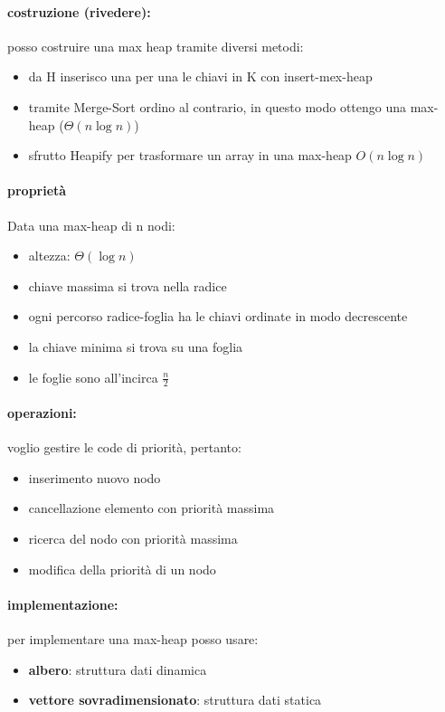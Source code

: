 \documentclass{article}
\begin{document}
\paragraph{costruzione (rivedere):} posso costruire una max heap tramite diversi metodi:
\begin{itemize}
    \item da H inserisco una per una le chiavi in K con insert-mex-heap
    \item tramite Merge-Sort ordino al contrario, in questo modo ottengo una max-heap ($\Theta(n \log n)$)
    \item sfrutto Heapify per trasformare un array in una max-heap $O(n \log n)$
\end{itemize}

\paragraph{proprietà} 
Data una max-heap di n nodi:
\begin{itemize}
    \item altezza: $\Theta(\log n)$
    \item chiave massima si trova nella radice
    \item ogni percorso radice-foglia ha le chiavi ordinate in modo decrescente
    \item la chiave minima si trova su una foglia
    \item le foglie sono all'incirca $\frac{n}{2}$
\end{itemize}

\paragraph{operazioni:}
voglio gestire le code di priorità, pertanto:
\begin{itemize}
    \item inserimento nuovo nodo
    \item cancellazione elemento con priorità massima
    \item ricerca del nodo con priorità massima
    \item modifica della priorità di un nodo
\end{itemize}

\paragraph{implementazione:} per implementare una max-heap posso usare:
\begin{itemize}
    \item \textbf{albero}: struttura dati dinamica 
    \item \textbf{vettore sovradimensionato}: struttura dati statica
\end{itemize}
\end{document}
